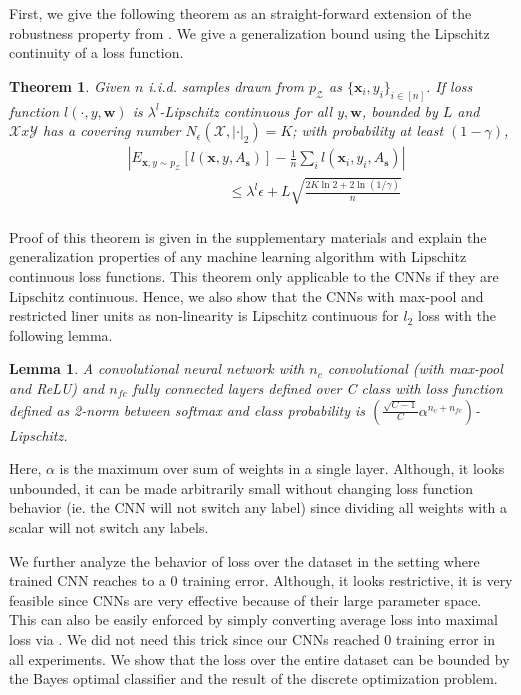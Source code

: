 \documentclass{article}
\newtheorem{theorem}{Theorem}
\newtheorem{lemma}{Lemma}
\begin{document}
First, we give the following theorem as an straight-forward extension of the robustness property from \cite{robust}. We give a generalization bound using the Lipschitz continuity of a loss function.

\begin{theorem}
Given $n$ i.i.d. samples drawn from $p_\mathcal{Z}$ as $\{\mathbf{x}_i,y_i\}_{i\in[n]}$. If loss function $l(\cdot,y,\mathbf{w})$ is $\lambda^l$-Lipschitz continuous for all $y, \mathbf{w}$, bounded by $L$ and $\mathcal{X}x\mathcal{Y}$ has a covering number $N_{\epsilon}(\mathcal{X},|\cdot|_2)=K$; with probability at least $(1-\gamma)$,
\[
\begin{aligned}
&\left|E_{\mathbf{x},y \sim p_\mathcal{Z}}[l(\mathbf{x},y, A_\mathbf{s})] - \frac{1}{n}\sum_i l(\mathbf{x}_i,y_i,A_\mathbf{s})\right| \\
 &\hspace{3cm}\leq  \lambda^l \epsilon + L \sqrt{\frac{2K\ln 2 + 2\ln (1/\gamma)}{n}}\\
\end{aligned}
\]
\label{mainthm}
\end{theorem}

Proof of this theorem is given in the supplementary materials and explain the generalization properties of any machine learning algorithm with Lipschitz continuous loss functions. This theorem only applicable to the CNNs if they are Lipschitz continuous. Hence, we also show that the CNNs with max-pool and restricted liner units as non-linearity is Lipschitz continuous for $l_2$ loss with the following lemma.

\begin{lemma}
A convolutional neural network with $n_c$ convolutional (with max-pool and ReLU) and $n_{fc}$ fully connected layers defined over C class with loss function defined as 2-norm between softmax and class probability is $\left(\frac{\sqrt{C-1}}{C} \alpha^{n_c+n_{fc}}\right)$-Lipschitz.
\end{lemma}

Here, $\alpha$ is the maximum over sum of weights in a single layer. Although, it looks unbounded, it can be made arbitrarily small without changing loss function behavior (ie. the CNN will not switch any label) since dividing all weights with a scalar will not switch any labels.

We further analyze the behavior of loss over the dataset in the setting where trained CNN reaches to a $0$ training error. Although, it looks restrictive, it is very feasible since CNNs are very effective because of their large parameter space. This can also be easily enforced by simply converting average loss into maximal loss via \cite{maximal_loss}. We did not need this trick since our CNNs reached 0 training error in all experiments. We show that the loss over the entire dataset can be bounded by the Bayes optimal classifier and the result of the discrete optimization problem.
\end{document}
